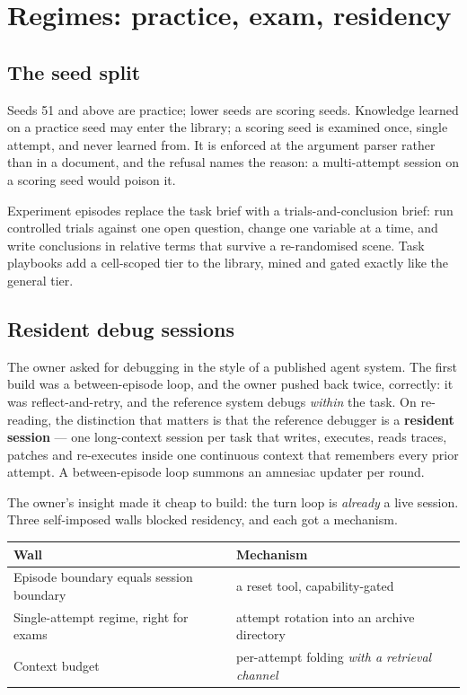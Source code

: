 \documentclass[11pt,a4paper]{report}
\begin{document}
\chapter{Regimes: practice, exam, residency}

\section{The seed split}

Seeds 51 and above are practice; lower seeds are scoring seeds. Knowledge
learned on a practice seed may enter the library; a scoring seed is examined
once, single attempt, and never learned from. It is enforced at the argument
parser rather than in a document, and the refusal names the reason: a
multi-attempt session on a scoring seed would poison it.

Experiment episodes replace the task brief with a trials-and-conclusion brief:
run controlled trials against one open question, change one variable at a time,
and write conclusions in relative terms that survive a re-randomised scene. Task
playbooks add a cell-scoped tier to the library, mined and gated exactly like
the general tier.

\section{Resident debug sessions}

The owner asked for debugging in the style of a published agent system. The
first build was a between-episode loop, and the owner pushed back twice,
correctly: it was reflect-and-retry, and the reference system debugs
\emph{within} the task. On re-reading, the distinction that matters is that the
reference debugger is a \textbf{resident session} --- one long-context session
per task that writes, executes, reads traces, patches and re-executes inside one
continuous context that remembers every prior attempt. A between-episode loop
summons an amnesiac updater per round.

The owner's insight made it cheap to build: the turn loop is \emph{already} a
live session. Three self-imposed walls blocked residency, and each got a
mechanism.

\begin{table}[htbp]
\centering\small
\begin{tabularx}{\textwidth}{@{}X X@{}}
\toprule
\textbf{Wall} & \textbf{Mechanism} \\
\midrule
Episode boundary equals session boundary & a reset tool, capability-gated \\
Single-attempt regime, right for exams & attempt rotation into an archive directory \\
Context budget & per-attempt folding \emph{with a retrieval channel} \\
\bottomrule
\end{tabularx}
\end{table}
\end{document}
